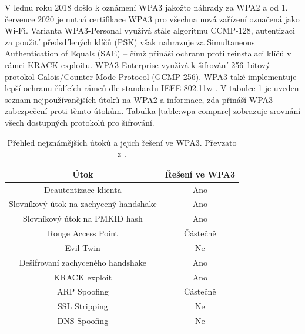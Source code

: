 V lednu roku 2018 došlo k oznámení WPA3 jakožto náhrady za WPA2 a od 1. července 2020 je nutná certifikace WPA3 pro všechna nová zařízení označená jako Wi-Fi. Varianta WPA3-Personal využívá stále algoritmu CCMP-128, autentizaci za použití předsdílených klíčů (PSK) však nahrazuje za Simultaneous Authentication of Equals (SAE) -- čímž přináší ochranu proti reinstalaci klíčů v rámci KRACK exploitu. WPA3-Enterprise využívá k šifrování 256--bitový protokol Galois/Counter Mode Protocol (GCMP-256). WPA3 také implementuje lepší ochranu řídících rámců dle standardu IEEE 802.11w \cite{jonnalagadda2009method}. V tabulce \ref{table:wpa3} je uveden seznam nejpoužívanějších útoků na WPA2 a informace, zda přináší WPA3 zabezpečení proti těmto útokům. Tabulka \ref{table:wpa-compare} zobrazuje srovnání všech dostupných protokolů pro šifrování.
\begin{table}[htb]
\centering
\begin{tabular}{|c|c|}
\hline
\textbf{Útok} &\textbf{Řešení ve WPA3} \\ \hline
Deautentizace klienta & Ano \\ \hline
Slovníkový útok na zachycený handshake & Ano \\ \hline
Slovníkový útok na PMKID hash & Ano \\ \hline
Rouge Access Point & Částečně \\ \hline
Evil Twin & Ne \\ \hline
Dešifrovaní zachyceného handshake & Ano \\ \hline
KRACK exploit & Ano \\ \hline
ARP Spoofing & Částečně \\ \hline
SSL Stripping & Ne \\ \hline
DNS Spoofing & Ne \\ \hline
\end{tabular}
\caption{Přehled nejznámějších útoků a jejich řešení ve WPA3. Převzato z \cite{kohlios2018comprehensive}.}
\label{table:wpa3}
\end{table}

